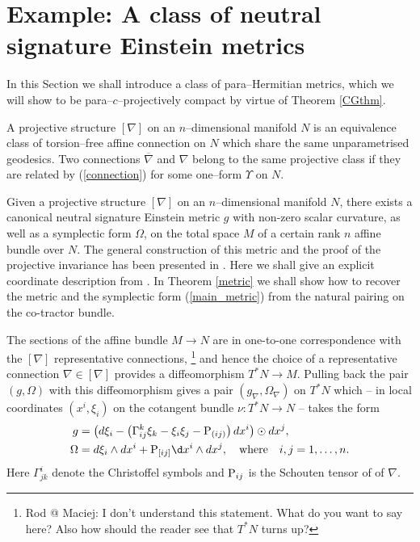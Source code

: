 \section{Example: A class of neutral signature Einstein metrics} 
\label{section_4}
\newcommand{\ol}[1]{\overline{#1}} \newcommand{\bp}{\boldsymbol{p}}
\newcommand{\cT}{\mathcal{T}} \newcommand{\cE}{\mathcal{E}} 
In this Section we shall  introduce a class of para--Hermitian metrics, which we will show to be para--$c$--projectively compact by virtue of Theorem \ref{CGthm}.
\begin{defi}
A projective structure $[\nabla]$ on an $n$--dimensional manifold $N$ is an equivalence class of torsion--free affine
connection on $N$ which share the same unparametrised geodesics.  Two connections $\overline{\nabla}$ and $\nabla$
belong to the same projective class if they are related by (\ref{connection}) for some one--form
$\Upsilon$ on $N$.
\end{defi}
Given a projective structure $[\nabla]$ on an $n$--dimensional manifold $N$, there exists  a canonical neutral signature Einstein metric $g$ with non-zero scalar curvature, as well as a symplectic form $\Omega$, on the total space $M$ of a certain rank $n$ affine bundle over $N$. The general construction of this metric and the proof of the projective invariance has been presented in \cite{DM}. Here we shall give an explicit coordinate description from \cite{DM}. In Theorem \ref{metric} we shall show how to recover the metric and the symplectic form (\ref{main_metric}) from the natural pairing on the co-tractor bundle.

The sections of the affine bundle $M \rightarrow N$ are in one-to-one
correspondence with the $[\nabla]$ representative connections, \footnote{Rod @ Maciej: I don't understand this statement. What do you want to say here? Also how should the reader see that $T^*N$ turns up?}
and
hence the choice of a representative connection $\nabla \in [\nabla]$
provides a diffeomorphism $T^*N \rightarrow M$. Pulling back the pair
$(g,\Omega)$ with this diffeomorphism gives a pair
$(g_{\nabla},\Omega_{\nabla})$ on $T^*N$ which -- in local coordinates
$(x^i,\xi_i)$ on the cotangent bundle $\nu : T^*N \to N$ -- takes the
form
\begin{align}
\label{main_metric}
g&=\left(d\xi_i-\left(\Gamma_{ij}^k \xi_k-\xi_i\xi_j-\Rho_{(ij)}\right)d x^i\right)\odot d x^j,\\
\Omega&=d \xi_i\wedge d x^i+\Rho_{[ij]}\d x^i\wedge d x^j,
\quad\mbox{where}\quad
i, j =1, \dots, n.
\nonumber
\end{align}
Here $\Gamma^i_{jk}$ denote the Christoffel symbols and $\mathrm{P}_{ij}$ is the Schouten tensor of of $\nabla$. 

